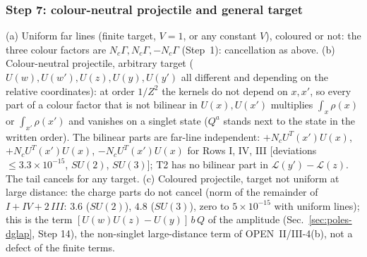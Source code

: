 \documentclass[10pt]{article}
\begin{document}
\subsubsection{Step 7: colour-neutral projectile and general target}
\noindent [N, \texttt{t2}] (a) Uniform far lines (finite target, $V=1$, or any constant $V$), coloured or not: the three colour factors are $N_{c}\Gamma,N_{c}\Gamma,-N_{c}\Gamma$ (Step~1): cancellation as above. (b) Colour-neutral projectile, arbitrary target ($U(w),U(w'),U(z),U(y),U(y')$ all different and depending on the relative coordinates): at order $1/Z^{2}$ the kernels do not depend on $x,x'$, so every part of a colour factor that is not bilinear in $U(x),U(x')$ multiplies $\int_{x}\rho(x)$ or $\int_{x'}\rho(x')$ and vanishes on a singlet state ($Q^{a}$ stands next to the state in the written order). The bilinear parts are far-line independent: $+N_{c}U^{T}(x')U(x)$, $+N_{c}U^{T}(x')U(x)$, $-N_{c}U^{T}(x')U(x)$ for Rows I, IV, III [deviations $\le3.3\times10^{-15}$, $SU(2)$, $SU(3)$]; T2 has no bilinear part in $\mathcal{L}(y')-\mathcal{L}(z)$. The tail cancels for any target. (c) Coloured projectile, target not uniform at large distance: the charge parts do not cancel (norm of the remainder of $I+IV+2\,III$: $3.6$ ($SU(2)$), $4.8$ ($SU(3)$), zero to $5\times10^{-15}$ with uniform lines); this is the term $[U(w)U(z)-U(y)]\,b\,Q$ of the amplitude (Sec.~\ref{sec:poles-dglap}, Step 14), the non-singlet large-distance term of OPEN~II/III-4(b), not a defect of the finite terms.
\end{document}
